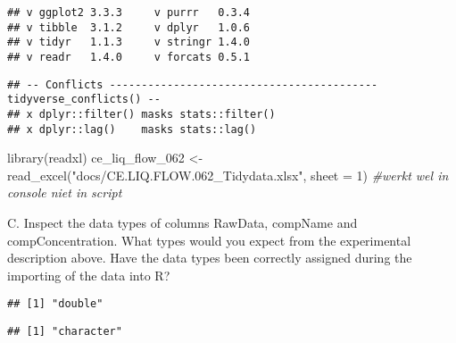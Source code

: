 \documentclass[
]{book}
\newenvironment{Shaded}{\begin{snugshade}}{\end{snugshade}}
\newcommand{\AttributeTok}[1]{\textcolor[rgb]{0.77,0.63,0.00}{#1}}
\newcommand{\CommentTok}[1]{\textcolor[rgb]{0.56,0.35,0.01}{\textit{#1}}}
\newcommand{\DecValTok}[1]{\textcolor[rgb]{0.00,0.00,0.81}{#1}}
\newcommand{\FunctionTok}[1]{\textcolor[rgb]{0.00,0.00,0.00}{#1}}
\newcommand{\NormalTok}[1]{#1}
\newcommand{\OtherTok}[1]{\textcolor[rgb]{0.56,0.35,0.01}{#1}}
\newcommand{\SpecialCharTok}[1]{\textcolor[rgb]{0.00,0.00,0.00}{#1}}
\newcommand{\StringTok}[1]{\textcolor[rgb]{0.31,0.60,0.02}{#1}}
\begin{document}
\begin{verbatim}
## v ggplot2 3.3.3     v purrr   0.3.4
## v tibble  3.1.2     v dplyr   1.0.6
## v tidyr   1.1.3     v stringr 1.4.0
## v readr   1.4.0     v forcats 0.5.1
\end{verbatim}

\begin{verbatim}
## -- Conflicts ------------------------------------------ tidyverse_conflicts() --
## x dplyr::filter() masks stats::filter()
## x dplyr::lag()    masks stats::lag()
\end{verbatim}

\begin{Shaded}
\begin{Highlighting}[]
\FunctionTok{library}\NormalTok{(readxl)}
\NormalTok{ce\_liq\_flow\_062 }\OtherTok{\textless{}{-}} \FunctionTok{read\_excel}\NormalTok{(}\StringTok{"docs/CE.LIQ.FLOW.062\_Tidydata.xlsx"}\NormalTok{, }\AttributeTok{sheet =} \DecValTok{1}\NormalTok{)}
\CommentTok{\#werkt wel in console niet in script}
\end{Highlighting}
\end{Shaded}

C. Inspect the data types of columns RawData, compName and compConcentration. What types would you expect from the experimental description above. Have the data types been correctly assigned during the importing of the data into R?

\begin{Shaded}
\end{Shaded}

\begin{verbatim}
## [1] "double"
\end{verbatim}

\begin{Shaded}
\end{Shaded}

\begin{verbatim}
## [1] "character"
\end{verbatim}

\begin{Shaded}
\end{Shaded}
\end{document}
